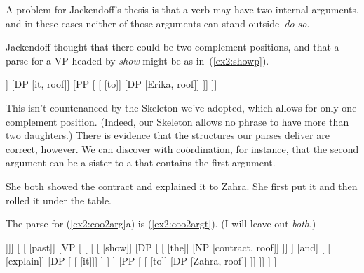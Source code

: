 A problem for Jackendoff's thesis is that a verb may have two internal arguments, and in these cases neither of those arguments can stand outside~\emph{do so}.
\begin{exe}
	\raggedright
	\ex \label{ex2:2argdoso} 
	\begin{xlist}
	\end{xlist}
\end{exe}
Jackendoff thought that there could be two complement positions, and that a parse for a VP headed by \emph{show} might be as in~(\ref{ex2:showp}).
\begin{exe}
	\raggedright
	\ex \label{ex2:showp} 
	\small
\begin{forest}
[VP [\ibar{V}
	[\obar{V} [show]]
	[DP [it, roof]]
	[PP [\ibar{P} 
		[ [to]]
		[DP [Erika, roof]]
	]]
]]
\end{forest}
\end{exe}
This isn't countenanced by the  Skeleton we've adopted, which allows for only one complement position. (Indeed, our  Skeleton allows no phrase to have more than two daughters.) There is evidence that the structures our parses deliver are correct, however. We can discover with co\"ordination, for instance, that the second argument can be a sister to a  that contains the first argument.
\begin{exe}
	\raggedright
	\ex \label{ex2:coo2arg} 
	\begin{xlist}
		\ex She both showed the contract and explained it to Zahra.
		\ex She first put it and then rolled it under the table.
	\end{xlist}
\end{exe}
The parse for (\ref{ex2:coo2arg}a) is (\ref{ex2:coo2argt}). (I will leave out \emph{both}.)
\begin{exe}
	\raggedright
	\ex \label{ex2:coo2argt} 
	\small
\begin{forest}
[IP
	[DP [\ibar{D} [\obar{D} [she]]]]
	[\ibar{I}
		[ [past]]
		[VP [\ibar{V} 
			[\ibar{V} 
				[\ibar{V} 
					[\obar{V} [show]]
					[DP [\ibar{D} 
						[\obar{D} [the]]
						[NP [contract, roof]]
					]]
				 ]
				[and]
				[\ibar{V}
					[\obar{V} [explain]]
					[DP [ [\obar{D} [it]]] ]
				]
			]
			[PP [
				[ [to]]
				[DP [Zahra, roof]]
			]]
		]]
	 ]
]
\end{forest}
\end{exe}%
